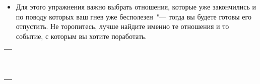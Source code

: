 \begin{itemize}
	\itemWritingHand В данном ниже пространстве запишите прошлые отношения, которые до сих пор у вас вызывают гнев и горечь, а потом вспомните какое-то конкретно событие в этих отношениях, которое вас вызвало у вас беспокойство (опять же, не слишком сильное)~"--- где-то 3 на шкале горечи от 1 до 10. Помните, что нельзя выбирать какой-то опыт, который нанёс вам психологическую травму или оставил психологические же шрамы. 
	
	\item Для этого упражнения важно выбрать отношения, которые уже закончились и по поводу которых ваш гнев уже бесполезен~"--- тогда вы будете готовы его отпустить. Не торопитесь, лучше найдите именно те отношения и то событие, с которым вы хотите поработать.
\end{itemize}
\setlength{\extrarowheight}{2mm}
\begin{tabularx}{\textwidth}{X}
	\\
	\arrayrulecolor{gray}\hline\\
	\hline\\
	\hline\\
	\hline\\
	\hline\\
	\hline\\	
	\hline\\
	\hline\\
	\hline\\
	\hline\\
	\hline\\
\end{tabularx}
\setlength{\extrarowheight}{0mm}
